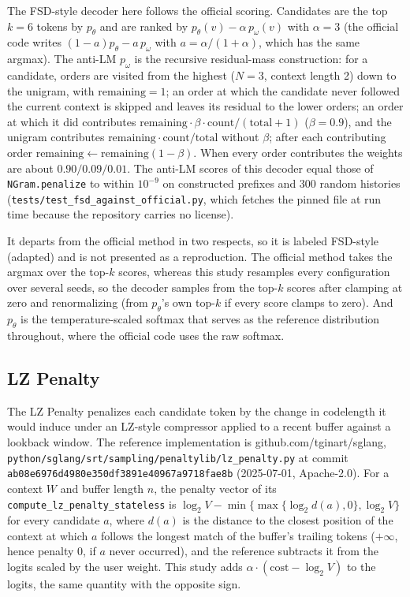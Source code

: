 \documentclass[11pt]{article}
\begin{document}
The FSD-style decoder here follows the official scoring. Candidates are the top $k{=}6$ tokens by $p_\theta$ and are ranked by $p_\theta(v)-\alpha\,p_\omega(v)$ with $\alpha{=}3$ (the official code writes $(1{-}a)p_\theta-a\,p_\omega$ with $a=\alpha/(1{+}\alpha)$, which has the same argmax). The anti-LM $p_\omega$ is the recursive residual-mass construction: for a candidate, orders are visited from the highest ($N{=}3$, context length 2) down to the unigram, with $\text{remaining}=1$; an order at which the candidate never followed the current context is skipped and leaves its residual to the lower orders; an order at which it did contributes $\text{remaining}\cdot\beta\cdot\text{count}/(\text{total}{+}1)$ ($\beta{=}0.9$), and the unigram contributes $\text{remaining}\cdot\text{count}/\text{total}$ without $\beta$; after each contributing order $\text{remaining}\leftarrow\text{remaining}(1-\beta)$. When every order contributes the weights are about $0.90/0.09/0.01$. The anti-LM scores of this decoder equal those of \texttt{NGram.penalize} to within $10^{-9}$ on constructed prefixes and 300 random histories (\texttt{tests/test\_\allowbreak{}fsd\_\allowbreak{}against\_\allowbreak{}official.py}, which fetches the pinned file at run time because the repository carries no license).

It departs from the official method in two respects, so it is labeled FSD-style (adapted) and is not presented as a reproduction. The official method takes the argmax over the top-$k$ scores, whereas this study resamples every configuration over several seeds, so the decoder samples from the top-$k$ scores after clamping at zero and renormalizing (from $p_\theta$'s own top-$k$ if every score clamps to zero). And $p_\theta$ is the temperature-scaled softmax that serves as the reference distribution throughout, where the official code uses the raw softmax.

\subsection{LZ Penalty}
\label{app:lz}
The LZ Penalty \citep{ginart2025lzpenalty} penalizes each candidate token by the change in codelength it would induce under an LZ-style compressor applied to a recent buffer against a lookback window. The reference implementation is github.com/tginart/sglang, \texttt{python/\allowbreak{}sglang/\allowbreak{}srt/\allowbreak{}sampling/\allowbreak{}penaltylib/\allowbreak{}lz\_\allowbreak{}penalty.py} at commit \texttt{ab08e6976d49\allowbreak{}80e350df3891\allowbreak{}e40967a9718f\allowbreak{}ae8b} (2025-07-01, Apache-2.0). For a context $W$ and buffer length $n$, the penalty vector of its \texttt{compute\_lz\_penalty\_stateless} is $\log_2V-\min\{\max\{\log_2 d(a),0\},\log_2V\}$ for every candidate $a$, where $d(a)$ is the distance to the closest position of the context at which $a$ follows the longest match of the buffer's trailing tokens ($+\infty$, hence penalty $0$, if $a$ never occurred), and the reference subtracts it from the logits scaled by the user weight. This study adds $\alpha\cdot(\text{cost}-\log_2V)$ to the logits, the same quantity with the opposite sign.
\end{document}
